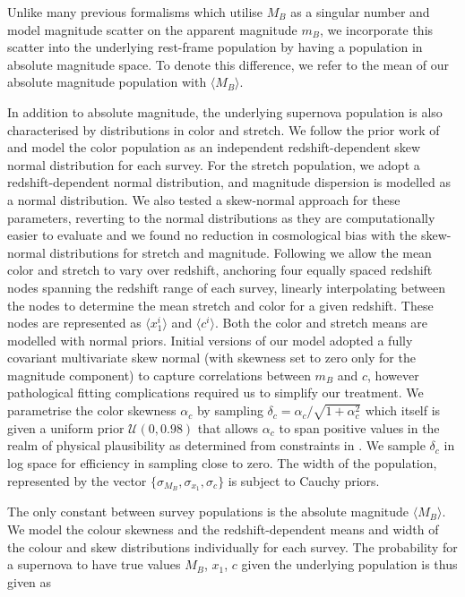 \documentclass[a4paper,fleqn,usenatbib]{emulateapj}
\newcommand{\rubin}{\citetalias{Rubin2015}}
\begin{document}
Unlike many previous formalisms which utilise $M_B$ as a singular number and model magnitude scatter on the apparent magnitude $m_B$, we incorporate this scatter into the underlying rest-frame population by having a population in absolute magnitude space. To denote this difference, we refer to the mean of our absolute magnitude population with $\langle M_B \rangle$.

In addition to absolute magnitude, the underlying supernova population is also characterised by distributions in color and stretch. We follow the prior work of {\rubin} and model the color population as an independent redshift-dependent skew normal distribution for each survey. For the stretch population, we adopt a redshift-dependent normal distribution, and magnitude dispersion is modelled as a normal distribution. We also tested a skew-normal approach for these parameters, reverting to the normal distributions as they are computationally easier to evaluate and we found no reduction in cosmological bias with the skew-normal distributions for stretch and magnitude. Following {\rubin} we allow the mean color and stretch to vary over redshift, anchoring four equally spaced redshift nodes spanning the redshift range of each survey, linearly interpolating between the nodes to determine the mean stretch and color for a given redshift. These nodes are represented as $\langle x_1^i \rangle$ and $\langle c^i \rangle$. Both the color and stretch means are modelled with normal priors. Initial versions of our model adopted a fully covariant multivariate skew normal (with skewness set to zero only for the magnitude component) to capture correlations between $m_B$ and $c$, however pathological fitting complications required us to simplify our treatment. We parametrise the color skewness $\alpha_c$ by sampling $\delta_c = \alpha_c / \sqrt{1 + \alpha_c^2}$ which itself is given a uniform prior $\mathcal{U}(0,0.98)$ that allows $\alpha_c$ to span positive values in the realm of physical plausibility as determined from constraints in \citet{Scolnic2016}. We sample $\delta_c$ in log space for efficiency in sampling close to zero. The width of the population, represented by the vector $\lbrace \sigma_{M_B}, \sigma_{x_1}, \sigma_c \rbrace$ is subject to Cauchy priors. 

The only constant between survey populations is the absolute magnitude $\langle M_B \rangle$. We model the colour skewness and the redshift-dependent means and width of the colour and skew distributions individually for each survey. The probability for a supernova to have true values $M_B$, $x_1$, $c$ given the underlying population is thus given as
\end{document}
